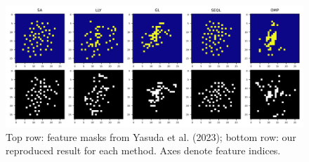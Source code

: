 \documentclass[a4paper,twocolumn]{article} %
\begin{document}
\begin{table}[ht]
\centering
\caption{Comparison of accuracy using all features. p-values are from one-sample t-tests against Lemhadri (2021)~\cite{lemhadri2021lassonet} and Yasuda (2023)'s reported means.}
\label{tab:all-feature-pval}
\end{table}
\begin{figure}[h!]
    \centering
    \includegraphics[width=\textwidth]{figures/all_methods_with_axis.png}
    \caption{Top row: feature masks from Yasuda et al. (2023); bottom row: our reproduced result for each method. Axes denote feature indices.}
    \label{fig:feature_masks}
\end{figure}
\end{document}

